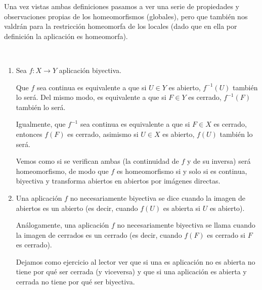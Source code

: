 Una vez vistas ambas definiciones pasamos a ver una serie de propiedades y observaciones propias de los homeomorfismos (globales), pero que también nos valdrán para la restricción homeomorfa de los locales (dado que en ella por definición la aplicación es homeomorfa).
\label{etop_obs_homeomorfismo}
\begin{obs}\
	\begin{enumerate}
		\item 
		Sea $f:X\rightarrow Y$ aplicación biyectiva.
		
		Que $f$ sea continua es equivalente a que si $U\in Y$ es abierto, $f^{-1}(U)$ también lo será. Del mismo modo, es equivalente a que si $F\in Y$ es cerrado, $f^{-1}(F)$ también lo será.
		
		Igualmente, que $f^{-1}$ sea continua es equivalente a que si $F\in X$ es cerrado, entonces $f(F)$ es cerrado, asimismo si $U\in X$ es abierto, $f(U)$ también lo será.
		
		Vemos como si se verifican ambas (la continuidad de $f$ y de su inversa) será homeomorfismo, de modo que $f$ es homeomorfismo si y solo si es continua, biyectiva y transforma abiertos en abiertos por imágenes directas.
		
		\item
		Una aplicación $f$ no necesariamente biyectiva se dice  cuando la imagen de abiertos es un abierto (es decir, cuando $f(U)$ es abierta si $U$ es abierto).
		
		Análogamente, una aplicación $f$ no necesariamente biyectiva se llama  cuando la imagen de cerrados es un cerrado (es decir, cuando $f(F)$ es cerrado si $F$ es cerrado).
		
		Dejamos como ejercicio al lector ver que si una es aplicación no es abierta no tiene por qué ser cerrada (y viceversa) y que si una aplicación es abierta y cerrada no tiene por qué ser biyectiva.\qedhere
		\end{enumerate}
\end{obs}
